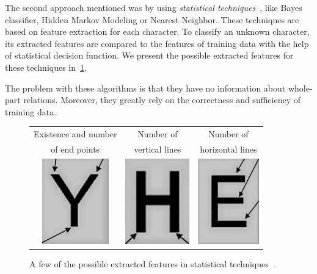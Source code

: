 The second approach mentioned was by using \emph{statistical techniques}~\citep{characterClassification}, like Bayes classifier, Hidden Markov Modeling or Nearest Neighbor. These techniques are based on feature extraction for each character. To classify an unknown character, its extracted features are compared to the features of training data with the help of statistical decision function. We present the possible extracted features for these techniques in~\cref{fig:characterClassificationStatis}.

The problem with these algorithms is that they have no information about whole-part relations. Moreover, they greatly rely on the correctness and sufficiency of training data.

\begin{figure}[t]
\centering
{\sffamily
\begin{tabular}{ccc}
Existence and number & Number of & Number of \\
of end points & vertical lines & horizontal lines \\
\includegraphics[height=10em]{img/characterClassification/statis_endPoint.jpg}
&
\includegraphics[height=10em]{img/characterClassification/statis_vertical.jpg}
&
\includegraphics[height=10em]{img/characterClassification/statis_horizontal.jpg} \\
\end{tabular}
}
\caption{A few of the possible extracted features in statistical techniques~\citep{vithlani2015structural}.}
\label{fig:characterClassificationStatis}
\end{figure}

